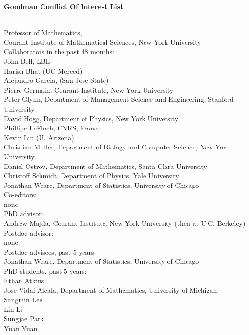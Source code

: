 \documentclass[11pt]{article}
\begin{document}
\begin{center}
{\Large{\textbf{Goodman Conflict Of Interest List}}}


\end{center}

\\
Professor of Mathematics, \\
Courant Institute of Mathematical Sciences, New York University\\

Collaborators in the past 48 months:\\

\noindent
John Bell, LBL \\
Harish Bhat (UC Merced) \\
Alejandro Garcia, (San Jose State) \\
Pierre Germain, Courant Institute, New York University\\
Peter Glynn, Department of Management Science and Engineering, Stanford University\\
David Hogg, Department of Physics, New York University\\
Phillipe LeFloch, CNRS, France\\
Kevin Lin (U. Arizona) \\
Christian Muller, Department of Biology and Computer Science, New York University\\
Daniel Ostrov, Department of Mathematics, Santa Clara University\\
Christoff Schmidt, Department of Physics, Yale University\\
Jonathan Weare, Department of Statistics, University of Chicago\\

Co-editors:\\

\noindent
none\\

PhD advisor:\\

\noindent
Andrew Majda, Courant Institute, New York University (then at U.C. Berkeley)\\

Postdoc advisor:\\

\noindent
none\\

Postdoc advisees, past 5 years:\\

\noindent
Jonathan Weare, Department of Statistics, University of Chicago\\

PhD students, past 5 years:\\

\noindent
Ethan Atkins\\
Jose Vidal Alcala, Department of Mathematics, University of Michigan\\
Sangmin Lee\\
Lin Li\\
Sungjae Park\\
Yuan Yuan\\
\end{document}
